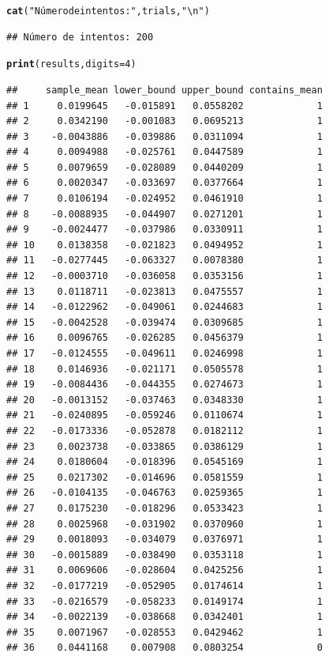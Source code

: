 \documentclass[12pt]{article}\usepackage[]{graphicx}\usepackage[]{xcolor}
\makeatletter
\newcommand{\hlnum}[1]{\textcolor[rgb]{0.686,0.059,0.569}{#1}}%
\newcommand{\hlsng}[1]{\textcolor[rgb]{0.192,0.494,0.8}{#1}}%
\newcommand{\hldef}[1]{\textcolor[rgb]{0.345,0.345,0.345}{#1}}%
\newcommand{\hlkwc}[1]{\textcolor[rgb]{0.333,0.667,0.333}{#1}}%
\newcommand{\hlkwd}[1]{\textcolor[rgb]{0.737,0.353,0.396}{\textbf{#1}}}%
\newenvironment{kframe}{%
 \def\at@end@of@kframe{}%
 \ifinner\ifhmode%
  \def\at@end@of@kframe{\end{minipage}}%
  \begin{minipage}{\columnwidth}%
 \fi\fi%
 \def\FrameCommand##1{\hskip\@totalleftmargin \hskip-\fboxsep
 \colorbox{shadecolor}{##1}\hskip-\fboxsep
     \hskip-\linewidth \hskip-\@totalleftmargin \hskip\columnwidth}%
 \MakeFramed {\advance\hsize-\width
   \@totalleftmargin\z@ \linewidth\hsize
   \@setminipage}}%
 {\par\unskip\endMakeFramed%
 \at@end@of@kframe}
\newenvironment{knitrout}{}{} %
\makeatother
\begin{document}
\begin{knitrout}
\begin{kframe}
\begin{alltt}
\hlkwd{cat}\hldef{(}\hlsng{"Número de intentos:"}\hldef{, trials,} \hlsng{"\textbackslash{}n"}\hldef{)}
\end{alltt}
\begin{verbatim}
## Número de intentos: 200
\end{verbatim}
\begin{alltt}
\hlkwd{print}\hldef{(results,} \hlkwc{digits}\hldef{=} \hlnum{4}\hldef{)}
\end{alltt}
\begin{verbatim}
##     sample_mean lower_bound upper_bound contains_mean
## 1     0.0199645   -0.015891   0.0558202             1
## 2     0.0342190   -0.001083   0.0695213             1
## 3    -0.0043886   -0.039886   0.0311094             1
## 4     0.0094988   -0.025761   0.0447589             1
## 5     0.0079659   -0.028089   0.0440209             1
## 6     0.0020347   -0.033697   0.0377664             1
## 7     0.0106194   -0.024952   0.0461910             1
## 8    -0.0088935   -0.044907   0.0271201             1
## 9    -0.0024477   -0.037986   0.0330911             1
## 10    0.0138358   -0.021823   0.0494952             1
## 11   -0.0277445   -0.063327   0.0078380             1
## 12   -0.0003710   -0.036058   0.0353156             1
## 13    0.0118711   -0.023813   0.0475557             1
## 14   -0.0122962   -0.049061   0.0244683             1
## 15   -0.0042528   -0.039474   0.0309685             1
## 16    0.0096765   -0.026285   0.0456379             1
## 17   -0.0124555   -0.049611   0.0246998             1
## 18    0.0146936   -0.021171   0.0505578             1
## 19   -0.0084436   -0.044355   0.0274673             1
## 20   -0.0013152   -0.037463   0.0348330             1
## 21   -0.0240895   -0.059246   0.0110674             1
## 22   -0.0173336   -0.052878   0.0182112             1
## 23    0.0023738   -0.033865   0.0386129             1
## 24    0.0180604   -0.018396   0.0545169             1
## 25    0.0217302   -0.014696   0.0581559             1
## 26   -0.0104135   -0.046763   0.0259365             1
## 27    0.0175230   -0.018296   0.0533423             1
## 28    0.0025968   -0.031902   0.0370960             1
## 29    0.0018093   -0.034079   0.0376971             1
## 30   -0.0015889   -0.038490   0.0353118             1
## 31    0.0069606   -0.028604   0.0425256             1
## 32   -0.0177219   -0.052905   0.0174614             1
## 33   -0.0216579   -0.058233   0.0149174             1
## 34   -0.0022139   -0.038668   0.0342401             1
## 35    0.0071967   -0.028553   0.0429462             1
## 36    0.0441168    0.007908   0.0803254             0

\end{verbatim}
\end{kframe}
\end{knitrout}
\end{document}
